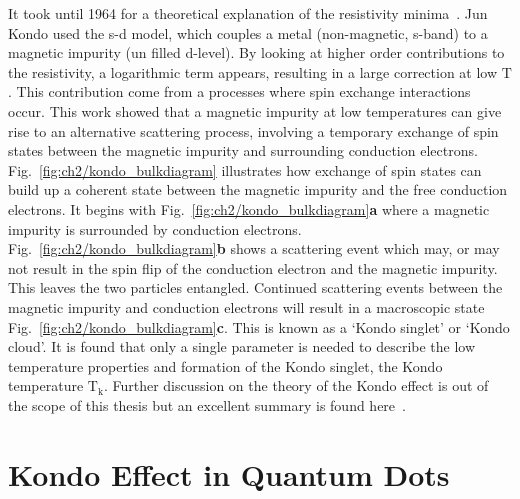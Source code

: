 It took until 1964 for a theoretical explanation of the resistivity minima~\cite{jun_kondo}. Jun Kondo used the s-d model, which couples a metal (non-magnetic, s-band) to a magnetic impurity (un filled d-level). By looking at higher order contributions to the resistivity, a logarithmic term appears, resulting in a large correction at low $\mathrm{T}$. This contribution come from a processes where spin exchange interactions occur. This work showed that a magnetic impurity at low temperatures can give rise to an alternative scattering process, involving a temporary exchange of spin states between the magnetic impurity and surrounding conduction electrons. Fig.~\ref{fig:ch2/kondo_bulkdiagram} illustrates how exchange of spin states can build up a coherent state between the magnetic impurity and the free conduction electrons. It begins with Fig.~\ref{fig:ch2/kondo_bulkdiagram}\textbf{a} where a magnetic impurity is surrounded by conduction electrons. 
Fig.~\ref{fig:ch2/kondo_bulkdiagram}\textbf{b} shows a scattering event which may, or may not result in the spin flip of the conduction electron and the magnetic impurity. This leaves the two particles entangled. Continued scattering events between the magnetic impurity and conduction electrons will result in a macroscopic state Fig.~\ref{fig:ch2/kondo_bulkdiagram}\textbf{c}. This is known as a `Kondo singlet' or `Kondo cloud'. It is found that only a single parameter is needed to describe the low temperature properties and formation of the Kondo singlet, the Kondo temperature $\mathrm{T_k}$. Further discussion on the theory of the Kondo effect is out of the scope of this thesis but an excellent summary is found here~\cite{kondo_theory_history}. 




\afterpage{\clearpage}
\section{Kondo Effect in Quantum Dots}

